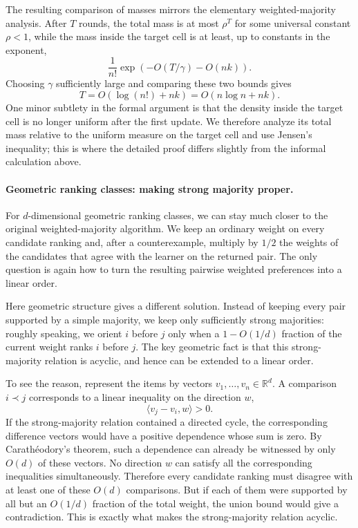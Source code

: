 \documentclass[11pt]{article}
\theoremstyle{definition}
\theoremstyle{remark}
\begin{document}
The resulting comparison of masses mirrors the elementary weighted-majority
analysis. After $T$ rounds, the total mass is at most
\(\rho^T\)
for some universal constant $\rho<1$, while the mass inside the target cell
is at least, up to constants in the exponent,
\[
    \frac{1}{n!}
    \exp\left(-O(T/\gamma)-O(nk)\right).
\]
Choosing $\gamma$ sufficiently large and comparing these two bounds gives
\[
    T=O(\log(n!)+nk)=O(n\log n+nk).
\]
One minor subtlety in the formal argument is that the density inside the
target cell is no longer uniform after the first update. We therefore
analyze its total mass relative to the uniform measure on the target cell and
use Jensen's inequality; this is where the detailed proof differs slightly
from the informal calculation above.


\paragraph{Geometric ranking classes: making strong majority proper.}
For $d$-dimensional geometric ranking classes, we can stay much closer to the
original weighted-majority algorithm. We keep an ordinary weight on every
candidate ranking and, after a counterexample, multiply by $1/2$ the weights
of the candidates that agree with the learner on the returned pair. The only
question is again how to turn the resulting pairwise weighted preferences
into a linear order.

Here geometric structure gives a different solution. Instead of keeping every
pair supported by a simple majority, we keep only sufficiently strong
majorities: roughly speaking, we orient $i$ before $j$ only when a
$1-O(1/d)$ fraction of the current weight ranks $i$ before $j$. The key
geometric fact is that this strong-majority relation is acyclic, and hence
can be extended to a linear order.

To see the reason, represent the items by vectors
$v_1,\ldots,v_n\in\mathbb R^d$. A comparison $i\prec j$ corresponds to a
linear inequality on the direction $w$,
\[
    \langle v_j-v_i,w\rangle>0.
\]
If the strong-majority relation contained a directed cycle, the corresponding
difference vectors would have a positive dependence whose sum is zero.
By Carath\'eodory's theorem, such a dependence can already be witnessed by
only $O(d)$ of these vectors. No direction $w$ can satisfy all the
corresponding inequalities simultaneously. Therefore every candidate ranking
must disagree with at least one of these $O(d)$ comparisons. But if each of
them were supported by all but an $O(1/d)$ fraction of the total weight, the
union bound would give a contradiction. This is exactly what makes the
strong-majority relation acyclic.
\end{document}
